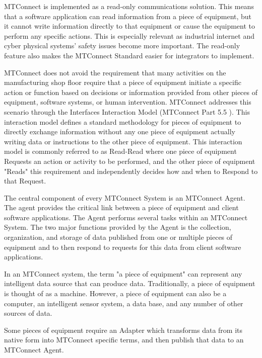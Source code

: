 MTConnect is implemented as a read-only communications solution.   This means that a software application can read information from a piece of equipment, but it cannot write information directly to that equipment or cause the equipment to perform any specific actions.  This is especially relevant as industrial internet and cyber physical systems' safety issues become more important.  The read-only feature also makes the MTConnect Standard easier for integrators to implement. 
 
MTConnect does not avoid the requirement that many activities on the manufacturing shop floor require that a piece of equipment initiate a specific action or function based on decisions or information provided from other pieces of equipment, software systems, or human intervention.   MTConnect addresses this scenario through the Interfaces Interaction Model (MTConnect Part 5.5 \cite{MTCPart5}).   This interaction model defines a standard methodology for pieces of equipment to directly exchange information without any one piece of equipment actually writing data or instructions to the other piece of equipment. This interaction model is commonly referred to as Read-Read where one piece of equipment Requests an action or activity to be performed, and the other piece of equipment "Reads" this requirement and independently decides how and when to Respond to that Request. 

The central component of every MTConnect System is an MTConnect Agent.  The agent provides the critical link between a piece of equipment and client software applications. The Agent performs several tasks within an MTConnect System.   The two major functions provided by the Agent is the collection, organization, and storage of data published from one or multiple pieces of equipment and to then respond to requests for this data from client software applications. 


\FloatBarrier
 
In an MTConnect system, the term "a piece of equipment" can represent any intelligent data source that can produce data.  Traditionally, a piece of equipment is thought of as a machine. However, a piece of equipment can also be a computer, an intelligent sensor system, a data base, and any number of other sources of data. 
 
Some pieces of equipment require an Adapter which transforms data from its native form into MTConnect specific terms, and then publish that data to an MTConnect Agent.